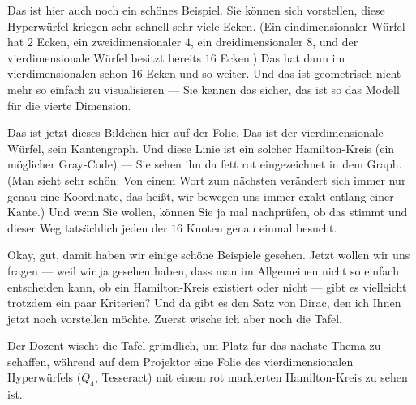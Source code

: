 \begin{spoken-clean}[00:52:40 - 00:54:38]
Das ist hier auch noch ein schönes Beispiel. Sie können sich vorstellen, diese Hyperwürfel kriegen sehr schnell sehr viele Ecken. (Ein eindimensionaler Würfel hat $2$ Ecken, ein zweidimensionaler $4$, ein dreidimensionaler $8$, und der vierdimensionale Würfel besitzt bereits $16$ Ecken.) Das hat dann im vierdimensionalen schon $16$ Ecken und so weiter. Und das ist geometrisch nicht mehr so einfach zu visualisieren --- Sie kennen das sicher, das ist so das Modell für die vierte Dimension.

Das ist jetzt dieses Bildchen hier auf der Folie. Das ist der vierdimensionale Würfel, sein Kantengraph. Und diese Linie ist ein solcher Hamilton-Kreis (ein möglicher Gray-Code) --- Sie sehen ihn da fett rot eingezeichnet in dem Graph. (Man sieht sehr schön: Von einem Wort zum nächsten verändert sich immer nur genau eine Koordinate, das heißt, wir bewegen uns immer exakt entlang einer Kante.) Und wenn Sie wollen, können Sie ja mal nachprüfen, ob das stimmt und dieser Weg tatsächlich jeden der $16$ Knoten genau einmal besucht.

Okay, gut, damit haben wir einige schöne Beispiele gesehen. Jetzt wollen wir uns fragen --- weil wir ja gesehen haben, dass man im Allgemeinen nicht so einfach entscheiden kann, ob ein Hamilton-Kreis existiert oder nicht --- gibt es vielleicht trotzdem ein paar Kriterien? Und da gibt es den Satz von Dirac, den ich Ihnen jetzt noch vorstellen möchte. Zuerst wische ich aber noch die Tafel.
\end{spoken-clean}

\begin{meta-note}[Tafelreinigung]
Der Dozent wischt die Tafel gründlich, um Platz für das nächste Thema zu schaffen, während auf dem Projektor eine Folie des vierdimensionalen Hyperwürfels ($Q_4$, Tesseract) mit einem rot markierten Hamilton-Kreis zu sehen ist.
\end{meta-note}

  
